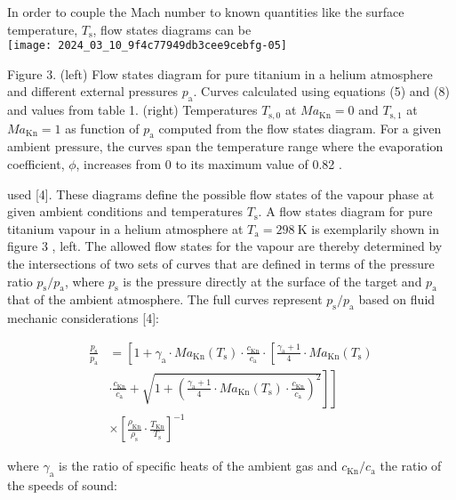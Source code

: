 \documentclass[10pt]{article}
\begin{document}
In order to couple the Mach number to known quantities like the surface temperature, $T_{\mathrm{s}}$, flow states diagrams can be\\
\texttt{[image: 2024\_03\_10\_9f4c77949db3cee9cebfg-05]}

Figure 3. (left) Flow states diagram for pure titanium in a helium atmosphere and different external pressures $p_{\mathrm{a}}$. Curves calculated using equations (5) and (8) and values from table 1. (right) Temperatures $T_{\mathrm{s}, 0}$ at $M a_{\mathrm{Kn}}=0$ and $T_{\mathrm{s}, 1}$ at $M a_{\mathrm{Kn}}=1$ as function of $p_{\mathrm{a}}$ computed from the flow states diagram. For a given ambient pressure, the curves span the temperature range where the evaporation coefficient, $\phi$, increases from 0 to its maximum value of 0.82 .

used [4]. These diagrams define the possible flow states of the vapour phase at given ambient conditions and temperatures $T_{\mathrm{s}}$. A flow states diagram for pure titanium vapour in a helium atmosphere at $T_{\mathrm{a}}=298 \mathrm{~K}$ is exemplarily shown in figure 3 , left. The allowed flow states for the vapour are thereby determined by the intersections of two sets of curves that are defined in terms of the pressure ratio $p_{\mathrm{s}} / p_{\mathrm{a}}$, where $p_{\mathrm{s}}$ is the pressure directly at the surface of the target and $p_{\mathrm{a}}$ that of the ambient atmosphere. The full curves represent $p_{\mathrm{s}} / p_{\mathrm{a}}$ based on fluid mechanic considerations [4]:


\begin{align*}
\frac{p_{\mathrm{s}}}{p_{\mathrm{a}}} & =\left[1+\gamma_{\mathrm{a}} \cdot M a_{\mathrm{Kn}}\left(T_{\mathrm{s}}\right) \cdot \frac{c_{\mathrm{Kn}}}{c_{\mathrm{a}}} \cdot\left[\frac{\gamma_{\mathrm{a}}+1}{4} \cdot M a_{\mathrm{Kn}}\left(T_{\mathrm{s}}\right)\right.\right. \\
& \left.\left.\cdot \frac{c_{\mathrm{Kn}}}{c_{\mathrm{a}}}+\sqrt{1+\left(\frac{\gamma_{\mathrm{a}}+1}{4} \cdot M a_{\mathrm{Kn}}\left(T_{\mathrm{s}}\right) \cdot \frac{c_{\mathrm{Kn}}}{c_{\mathrm{a}}}\right)^{2}}\right]\right] \\
& \times\left[\frac{\rho_{\mathrm{Kn}}}{\rho_{\mathrm{s}}} \cdot \frac{T_{\mathrm{Kn}}}{T_{\mathrm{s}}}\right]^{-1} \tag{8}
\end{align*}


where $\gamma_{\mathrm{a}}$ is the ratio of specific heats of the ambient gas and $c_{\mathrm{Kn}} / c_{\mathrm{a}}$ the ratio of the speeds of sound:
\end{document}
